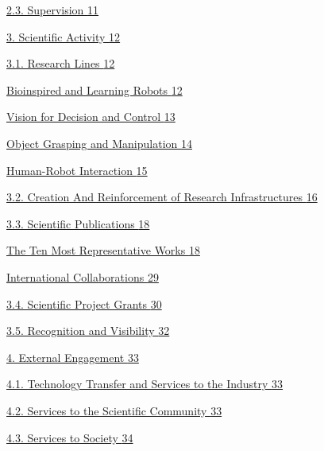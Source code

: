 \documentclass[
]{article}
\begin{document}
\hyperref[supervision]{2.3. Supervision \hyperref[supervision]{11}}

\hyperref[scientific-activity]{3. Scientific Activity
\hyperref[scientific-activity]{12}}

\hyperref[research-lines]{3.1. Research Lines
\hyperref[research-lines]{12}}

\hyperref[bioinspired-and-learning-robots]{Bioinspired and Learning
Robots \hyperref[bioinspired-and-learning-robots]{12}}

\hyperref[vision-for-decision-and-control]{Vision for Decision and
Control \hyperref[vision-for-decision-and-control]{13}}

\hyperref[object-grasping-and-manipulation]{Object Grasping and
Manipulation \hyperref[object-grasping-and-manipulation]{14}}

\hyperref[human-robot-interaction]{Human-Robot Interaction
\hyperref[human-robot-interaction]{15}}

\hyperref[creation-and-reinforcement-of-research-infrastructures]{3.2.
Creation And Reinforcement of Research Infrastructures
\hyperref[creation-and-reinforcement-of-research-infrastructures]{16}}

\hyperref[scientific-publications]{3.3. Scientific Publications
\hyperref[scientific-publications]{18}}

\hyperref[the-ten-most-representative-works]{The Ten Most Representative
Works \hyperref[the-ten-most-representative-works]{18}}

\hyperref[international-collaborations]{International Collaborations
\hyperref[international-collaborations]{29}}

\hyperref[scientific-project-grants]{3.4. Scientific Project Grants
\hyperref[scientific-project-grants]{30}}

\hyperref[recognition-and-visibility]{3.5. Recognition and Visibility
\hyperref[recognition-and-visibility]{32}}

\hyperref[external-engagement]{4. External Engagement
\hyperref[external-engagement]{33}}

\hyperref[technology-transfer-and-services-to-the-industry]{4.1.
Technology Transfer and Services to the Industry
\hyperref[technology-transfer-and-services-to-the-industry]{33}}

\hyperref[services-to-the-scientific-community]{4.2. Services to the
Scientific Community
\hyperref[services-to-the-scientific-community]{33}}

\hyperref[services-to-society]{4.3. Services to Society
\hyperref[services-to-society]{34}}
\end{document}
